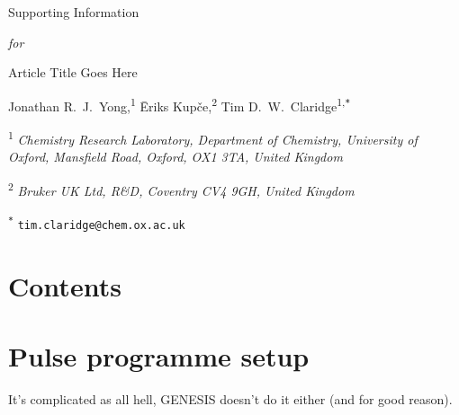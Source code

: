 \documentclass[a4paper,12pt]{article}
\newcommand{\articletitle}{Article Title Goes Here}
\newcommand{\crl}{Chemistry Research Laboratory, Department of Chemistry, University of Oxford, Mansfield Road, Oxford, OX1 3TA, United Kingdom}
\newcommand{\brukeruk}{Bruker UK Ltd, R\&D, Coventry CV4 9GH, United Kingdom}
\begin{document}

\clearpage
\begin{refsection}
\newcommand{\sectionbreak}{\clearpage}
\renewcommand*{\thefigure}{S\arabic{figure}}
\renewcommand*{\thesection}{S\arabic{section}}
\renewcommand*{\thetable}{S\arabic{table}}
\renewcommand*{\thepage}{S\arabic{page}}
\setcounter{page}{1}
\setcounter{figure}{0}
\setcounter{section}{0}
\setcounter{table}{0}
\onehalfspacing

\hspace{0pt}
\vfill
\begin{center}
    \huge
    Supporting Information

    \vspace{0.3cm}

    \textit{for}

    \vspace{0.3cm}

    \articletitle{}

    \vspace{0.6cm}

    \Large Jonathan R.\ J.\ Yong,\textsuperscript{1} {\=E}riks Kup{\v{c}}e,\textsuperscript{2} Tim D.\ W.\ Claridge\textsuperscript{1,\texttt{*}}

    \vspace{0.6cm}

    \large \textsuperscript{1} \textit{\crl{}}

    \textsuperscript{2} \textit{\brukeruk{}}

    \textsuperscript{\texttt{*}} \texttt{tim.claridge@chem.ox.ac.uk}

\end{center}

\vspace{2cm}
\section*{Contents}

\startcontents[si]
\vfill
\hspace{0pt}
\newpage

\section{Pulse programme setup}

It's complicated as all hell, GENESIS\autocite{Yong2022AC} doesn't do it either (and for good reason).

\AtNextBibliography{\small}
\printbibliography{}
\clearpage    %

\end{refsection}
\end{document}

